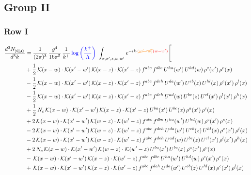 \documentclass[9pt]{article}
\numberwithin{equation}{section}
\begin{document}
\subsection{Group II}
\subsubsection{Row I}
\begin{align}
 \frac{d^{3}N_{\rm NLO}^{\rm}}{d^{3}k}  & = \frac{1}{(2\pi)^{3}}\,\frac{g^{4}}{16\pi^{5}}\,\frac{1}{k^{+}}\,{\color{blue}\log{\left(\frac{k^{+}}{\Lambda}\right)}}\,\,\int_{x,x',z,w,w'}e^{-ik\cdot{\color{orange}\cancel{(w'-w)}}{\color{red}(w-w')}}\Bigg[\notag\\
&+\frac{1}{2}\,\mathcal{K}(x-w)\cdot\mathcal{K}(x'-w')\,\mathcal{K}(x-z)\cdot\mathcal{K}(x'-z)\,f^{abc}\,f^{dbe}\,U^{ha}(w')\,U^{hd}(w)\,\rho^{c}(x')\,\rho^{e}(x)\notag\\
&-\frac{1}{2}\,\mathcal{K}(x-w)\cdot\mathcal{K}(x'-w')\,\mathcal{K}(x-z)\cdot\mathcal{K}(x'-z)\,f^{abc}\,f^{deh}\,U^{da}(w')\,U^{eb}(z)\,U^{hl}(x)\,\rho^{c}(x')\,\rho^{l}(x)\notag\\
&-\frac{1}{2}\,\mathcal{K}(x-w)\cdot\mathcal{K}(x'-w')\,\mathcal{K}(x-z)\cdot\mathcal{K}(x'-z)\,f^{abc}\,f^{deh}\,U^{ad}(w)\,U^{be}(z)\,U^{cl}(x')\,\rho^{l}(x')\,\rho^{h}(x)\notag\\
&+\frac{1}{2}\,N_{c}\,\mathcal{K}(x-w)\cdot\mathcal{K}(x'-w')\,\mathcal{K}(x-z)\cdot\mathcal{K}(x'-z)\,U^{ba}(x')\,U^{bc}(x)\,\rho^{a}(x')\,\rho^{c}(x)\notag\\
&+2\,\mathcal{K}(x-w)\cdot\mathcal{K}(x'-w')\,\mathcal{K}(w-z)\cdot\mathcal{K}(w'-z)\,f^{abc}\,f^{dbe}\,U^{ha}(w')\,U^{hd}(w)\,\rho^{c}(x')\,\rho^{e}(x)\notag\\
&-2\,\mathcal{K}(x-w)\cdot\mathcal{K}(x'-w')\,\mathcal{K}(w-z)\cdot\mathcal{K}(w'-z)\,f^{abc}\,f^{deh}\,U^{da}(w')\,U^{eb}(z)\,U^{hl}(x)\,\rho^{c}(x')\,\rho^{l}(x)\notag\\
&-2\,\mathcal{K}(x-w)\cdot\mathcal{K}(x'-w')\,\mathcal{K}(w-z)\cdot\mathcal{K}(w'-z)\,f^{abc}\,f^{deh}\,U^{ad}(w)\,U^{be}(z)\,U^{cl}(x')\,\rho^{l}(x')\,\rho^{h}(x)\notag\\
&+2\,N_{c}\,\mathcal{K}(x-w)\cdot\mathcal{K}(x'-w')\,\mathcal{K}(w-z)\cdot\mathcal{K}(w'-z)\,U^{ba}(x')\,U^{bc}(x)\,\rho^{a}(x')\,\rho^{c}(x)\notag\\
&-\,\mathcal{K}(x-w)\cdot\mathcal{K}(x'-w')\,\mathcal{K}(x-z)\cdot\mathcal{K}(w'-z)\,f^{abc}\,f^{dbe}\,U^{ha}(w')\,U^{hd}(w)\,\rho^{c}(x')\,\rho^{e}(x)\notag\\
&+\,\mathcal{K}(x-w)\cdot\mathcal{K}(x'-w')\,\mathcal{K}(x-z)\cdot\mathcal{K}(w'-z)\,f^{abc}\,f^{deh}\,U^{da}(w')\,U^{eb}(z)\,U^{hl}(x)\,\rho^{c}(x')\,\rho^{l}(x)\notag\\

\end{align}
\end{document}
